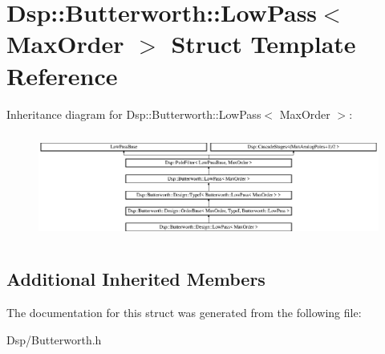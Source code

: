 \hypertarget{structDsp_1_1Butterworth_1_1LowPass}{\section{Dsp\-:\-:Butterworth\-:\-:Low\-Pass$<$ Max\-Order $>$ Struct Template Reference}
\label{structDsp_1_1Butterworth_1_1LowPass}
}
Inheritance diagram for Dsp\-:\-:Butterworth\-:\-:Low\-Pass$<$ Max\-Order $>$\-:\begin{figure}[H]
\begin{center}
\leavevmode
\includegraphics[height=3.529412cm]{structDsp_1_1Butterworth_1_1LowPass}
\end{center}
\end{figure}
\subsection*{Additional Inherited Members}


The documentation for this struct was generated from the following file\-:\begin{DoxyCompactItemize}
\item 
Dsp/Butterworth.\-h\end{DoxyCompactItemize}
